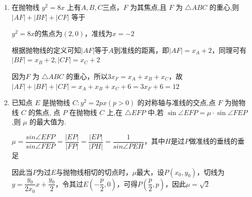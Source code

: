 \begin{enumerate}
\begin{jieda}
        如图, ${PA}\bot {AC},{PB}\bot {BC}$ ,则 ${S}_{\text{四边形 }{PACB}} = 2 \times  \dfrac{1}{2}\left| {PA}\right|  \cdot  \left| {CA}\right|  = 2\left| {PA}\right|$ .
        而 $\left| {PA}\right|  = \sqrt{{\left| PC\right| }^{2} - {\left| CA\right| }^{2}} = \sqrt{{\left| PC\right| }^{2} - 4}$ ,当 $\left| {PC}\right|$ 最小时, $\left| {PA}\right|$ 最小,则 ${S}_{\text{四边形 }{PACB}} = 2\left| {PA}\right|$ 最小;
        由于 $p$ 在抛物线 ${y}^{2} = {4x}$ 上,设 $P\left( {{t}^{2},{2t}}\right)$ .
        则 $\left| {PC}\right|  = \sqrt{{\left( {t}^{2} - 3\right) }^{2} + {\left( 2t\right) }^{2}} = \sqrt{{t}^{4} - 2{t}^{2} + 9} = \sqrt{{\left( {t}^{2} - 1\right) }^{2} + 8}$ ,
        当 ${t}^{2} = 1$ 时, ${\left( {t}^{2} - 1\right) }^{2} + 8$ 取最小值 8 ,即 $\left| {PC}\right|$ 取到最小值 $2\sqrt{2}$ ,
        则 $\left| {PA}\right|  = \sqrt{{\left| PC\right| }^{2} - 4}$ 取最小值 2 ,故 ${S}_{\text{四边形 }{PACB}} = 2\left| {PA}\right|$ 的最小值为 4.
    \end{jieda}

    \item 在抛物线 ${y}^{2} = {8x}$ 上有$A,B,C$三点，$F$ 为其焦点,且 $F$ 为 $\bigtriangleup  {ABC}$ 的重心,则 $\left| {AF}\right|  + \left| {BF}\right|  + \left| {CF}\right|$ 等于
    \begin{jieda}
        ${y}^{2} = {8x}$的焦点为$(2, 0)$，准线为$x = -2$
        
        根据抛物线的定义可知$|AF|$等于$A$到准线的距离，即$|AF| = x_A + 2$，同理可有$|BF| = x_B + 2, |CF| = x_C + 2$
    
        因为$F$ 为 $\bigtriangleup  {ABC}$ 的重心，所以$3x_F = x_A + x_B + x_C$，故$\left| {AF}\right|  + \left| {BF}\right|  + \left| {CF}\right| = x_A + x_B + x_C + 6 = 3x_F + 6 = 12$
    \end{jieda}

    \item 已知点 $E$ 是抛物线 $C : {y}^{2} = {2px}\left( {p > 0}\right)$ 的对称轴与准线的交点,点 $F$ 为抛物线 $C$ 的焦点, 点 $P$ 在抛物线 $C$ 上,在 $\bigtriangleup {EFP}$ 中,若 $\sin \angle {EFP} = \mu  \cdot  \sin \angle {FEP}$ ,则 $\mu$ 的最大值为.
    \begin{jieda}
        $\mu = \dfrac{sin\angle{EFP}}{sin\angle{FEP}} = \dfrac{|EP|}{|FP|} = \dfrac{|EP|}{|PH|} = \dfrac{1}{sin\angle{PEH}}$，其中$H$是过$P$做准线的垂线的垂足

        因此当$P$为过$E$与抛物线相切的切点时，$\mu$最大，设$P(x_0, y_0)$，切线为$y = \dfrac{y_0}{2x_0}x+\dfrac{y_0}{2}$，令其过$E\left(-\dfrac{p}{2}, 0\right)$，可得$P\left(\dfrac{p}{2}, p\right)$，因此$\mu = \sqrt{2}$
    \end{jieda}
    

\end{enumerate}

